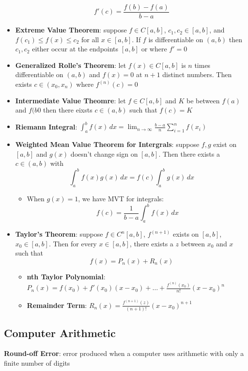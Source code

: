 \documentclass{article}
\begin{document}
\begin{itemize}
      \[f'(c) = \frac{f(b) - f(a)}{b - a}\]
    \item \textbf{Extreme Value Theorem}: suppose $f \in C[a,b]$, $c_1, c_2 \in [a,b]$, and $f(c_1) \leq f(x) \leq c_2$ for all $x \in [a,b]$. If $f$ is differentiable on $(a,b)$ then $c_1, c_2$ either occur at the endpoints $[a,b]$ or where $f' = 0$
    \item \textbf{Generalized Rolle's Theorem}: let $f(x) \in C[a,b]$ is $n$ times differentiable on $(a,b)$ and $f(x) = 0$ at $n+1$ distinct numbers. Then exists $c \in (x_0, x_n)$ where $f^{(n)}(c) = 0$
    \item \textbf{Intermediate Value Theomre}: let $f \in C[a,b]$ and $K$ be between $f(a)$ and $f(b0$ then there eixsts $c \in (a,b)$ such that $f(c) = K$
    \item \textbf{Riemann Integral}: $\int_a^b f(x) \, dx = \lim_{n \rightarrow \infty} \frac{b-a}{n} \sum_{i = 1}^n f(x_i)$
    \item \textbf{Weighted Mean Value Theorem for Intergrals}: suppose $f, g$ exist on $[a,b]$ and $g(x)$ doesn't change sign on $[a,b]$. Then there exists a $c \in (a,b)$ with
      \[\int_a^b f(x) g(x) \, dx = f(c) \int_a^b g(x) \, dx\]
      \begin{itemize}
        \item When $g(x) = 1$, we have MVT for integrals:
          \[f(c) = \frac{1}{b-a} \int_a^b f(x) \, dx\]
      \end{itemize}
    \item \textbf{Taylor's Theorem}: suppose $f \in C^n[a,b]$, $f^{(n+1)}$ exists on $[a,b]$, $x_0 \in [a,b]$. Then for every $x \in [a,b]$, there exists a $z$ between $x_0$ and $x$ such that
      \[f(x) = P_n(x) + R_n(x)\]
      \begin{itemize}
        \item \textbf{nth Taylor Polynomial}: $P_n(x) = f(x_0) + f'(x_0)(x-x_0) + \ldots + \frac{f^{(n)}(x_0)}{n!}(x-x_0)^n$
        \item \textbf{Remainder Term}: $R_n(x) = \frac{f^{(n+1)}(z)}{(n+1)!}(x-x_0)^{n+1}$
      \end{itemize}
  \end{itemize}
  \subsection{Computer Arithmetic}
  \textbf{Round-off Error}: error produced when a computer uses arithmetic with only a finite number of digits
\end{document}
